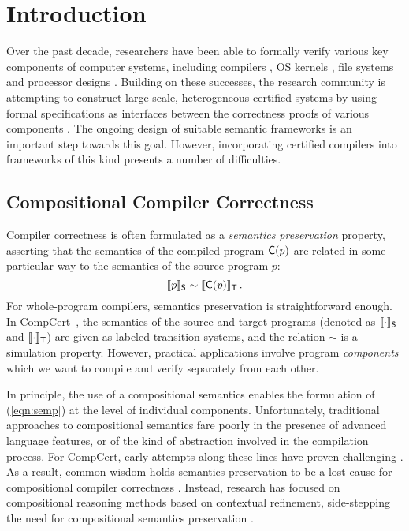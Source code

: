 \section{Introduction}
\label{sec:intro}

Over the past decade, researchers have been able to formally verify
various key components of computer systems, including compilers
\cite{compcert,cakeml,vellvm}, OS kernels \cite{sel4,dscal15,certikos-osdi16},
file systems \cite{fscq} and processor designs \cite{safe,kami}.
Building on these successes, the research community is attempting to
construct large-scale, heterogeneous certified systems by using formal
specifications as interfaces between the correctness proofs of various
components \cite{deepspec}.  The ongoing design of suitable semantic
frameworks is an important step towards this goal.  However,
incorporating certified compilers into frameworks of this kind
presents a number of difficulties.

\subsection{Compositional Compiler Correctness}
\label{ssec:intro-ccc}

Compiler correctness is often formulated as a \emph{semantics
preservation} property, asserting that the semantics of the compiled
program $ \mathsf{C} (p)$ are related in some particular way to the
semantics of the source program $p$:
\begin{equation} \label{eqn:semp}
  \llbracket p \rrbracket_{ \mathsf{S} } \sim
  \llbracket  \mathsf{C} (p) \rrbracket_{ \mathsf{T} }
  \,.
\end{equation}
For whole-program compilers, semantics preservation is straightforward
enough.  In CompCert~\cite{compcert}, the semantics of the source and
target programs (denoted as $\llbracket \cdot \rrbracket_{ \mathsf{S} }$
and $\llbracket \cdot \rrbracket_{ \mathsf{T} }$)
are given as labeled transition systems, and the
relation $\sim$ is a simulation property.
However, practical applications involve program \emph{components}
which we want to compile and verify separately from each other.

In
principle, the use of a compositional semantics enables the
formulation of (\ref{eqn:semp}) at the level of individual components.
Unfortunately, traditional approaches to compositional semantics fare
poorly in the presence of advanced language features, or of the kind
of abstraction involved in the compilation process.  For CompCert,
early attempts along these lines have proven challenging
\cite{cpp15,compcompcert}.
%
As a result, common wisdom holds semantics preservation to be a lost
cause for compositional compiler correctness \cite{next700}.  Instead,
research has focused on compositional reasoning methods based on
contextual refinement, side-stepping the need for compositional
semantics preservation \cite{sepcompcert,compcertm}.


